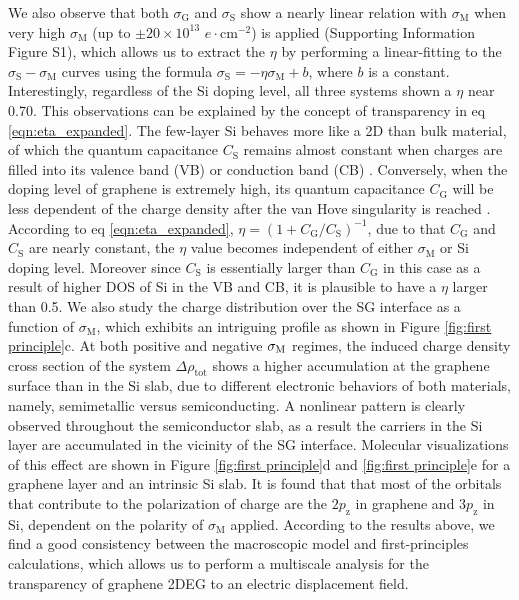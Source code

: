 \documentclass[journal=nalefd]{achemso}
\newcommand*\subs[1]{_{\text{#1}}} %
\begin{document}
We also observe that both $\sigma\subs{G}$ and $\sigma\subs{S}$ show a nearly linear relation with $\sigma\subs{M}$ when very high $\sigma\subs{M}$ (up to $\pm20\times10^{13}$ $e\cdot$cm$^{-2}$) is applied (Supporting Information Figure S1), which allows us to extract the $\eta$ by performing a linear-fitting to the $\sigma\subs{S}-\sigma\subs{M}$ curves using 
the formula $\sigma\subs{S}=-\eta \sigma\subs{M} + b$, where $b$ is a constant.
Interestingly, regardless of the Si doping level, all three systems shown a $\eta$ near 0.70.
This observations can be explained by the concept of transparency in eq \ref{eqn:eta_expanded}. 
The few-layer Si behaves more like a 2D than bulk material, of which the quantum 
capacitance $C\subs{S}$ remains almost constant when charges are filled into its 
valence band (VB) or conduction band (CB) \cite{Davies1997Physics}.
Conversely, when the doping level of graphene is extremely high, its quantum capacitance $C\subs{G}$ will be less dependent of the charge density after the van Hove singularity is reached \cite{Sarma2011Electronic}. 
According to eq \ref{eqn:eta_expanded}, $\eta=(1+C\subs{G}/C\subs{S})^{-1}$, due to that $C\subs{G}$ and $C\subs{S}$ are nearly constant, the $\eta$ value becomes independent of either $\sigma\subs{M}$ or Si doping level.
Moreover since $C\subs{S}$ is essentially larger than $C\subs{G}$ in this case as a result of higher DOS of Si in the VB and CB, it is plausible to have a $\eta$ larger than 0.5.
We also study the charge distribution over the SG interface as a function of $\sigma\subs{M}$, which exhibits an intriguing profile as shown in Figure \ref{fig:first principle}c. 
At both positive and negative $\sigma_{\rm M}$ regimes, the induced charge density cross section of the system $\Delta \rho\subs{tot}$ shows a higher accumulation at the graphene surface than in the Si slab, due to different electronic behaviors of both materials, namely, semimetallic versus semiconducting. 
A nonlinear pattern is clearly observed throughout the semiconductor slab, 
as a result the carriers in the Si layer are accumulated in the vicinity of the SG interface.
Molecular visualizations of this effect are shown in Figure \ref{fig:first principle}d and \ref{fig:first principle}e for a graphene layer and an intrinsic Si slab.
It is found that that most of the orbitals that contribute to the polarization of charge are the $2p\subs{z}$ in graphene and 
$3p\subs{z}$ in Si, dependent on the polarity of $\sigma\subs{M}$ applied. 
According to the results above, we find a good consistency between the macroscopic model and first-principles calculations, which allows us to perform a multiscale analysis for the transparency of graphene 2DEG to an electric displacement field. 
        
\end{document}
